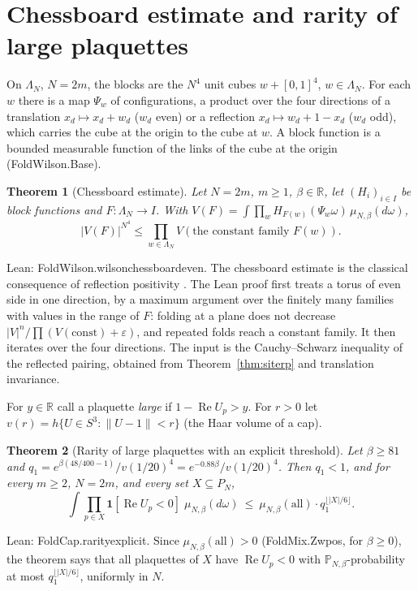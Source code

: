 \documentclass[11pt,a4paper]{article}
\newtheorem{theorem}{Theorem}[section]
\theoremstyle{definition}
\theoremstyle{remark}
\newcommand{\leanus}{\textunderscore\allowbreak{}}
\newcommand{\leandot}{.\allowbreak{}}
\newcommand{\lean}[1]{{\ttfamily\let\_\leanus #1}}
\newcommand{\R}{\mathbb{R}}
\renewcommand{\Re}{\operatorname{Re}}
\begin{document}
\section{Chessboard estimate and rarity of large plaquettes}\label{sec:peierls}

On $\Lambda_N$, $N=2m$, the blocks are the $N^4$ unit cubes $w+[0,1]^4$, $w\in\Lambda_N$. For each $w$ there is a map $\Psi_w$ of configurations, a product over the four directions of a translation $x_d\mapsto x_d+w_d$ ($w_d$ even) or a reflection $x_d\mapsto w_d+1-x_d$ ($w_d$ odd), which carries the cube at the origin to the cube at $w$. A block function is a bounded measurable function of the links of the cube at the origin (\lean{FoldWilson\leandot{}Base}).

\begin{theorem}[Chessboard estimate]\label{thm:chess}
Let $N=2m$, $m\ge1$, $\beta\in\R$, let $(H_i)_{i\in I}$ be block functions and $F:\Lambda_N\to I$. With $V(F)=\int\prod_{w}H_{F(w)}(\Psi_w\omega)\,\mu_{N,\beta}(d\omega)$,
\[
|V(F)|^{N^4}\le\prod_{w\in\Lambda_N}V(\text{the constant family }F(w)).
\]
\end{theorem}
Lean: \lean{FoldWilson\leandot{}wilson\_chessboard\_even}. The chessboard estimate is the classical consequence of reflection positivity \cite{FILS,Bis}. The Lean proof first treats a torus of even side in one direction, by a maximum argument over the finitely many families with values in the range of $F$: folding at a plane does not decrease $|V|^{n}/\prod(V(\text{const})+\varepsilon)$, and repeated folds reach a constant family. It then iterates over the four directions. The input is the Cauchy--Schwarz inequality of the reflected pairing, obtained from Theorem~\ref{thm:siterp} and translation invariance.

For $y\in\R$ call a plaquette \emph{large} if $1-\Re U_p>y$. For $r>0$ let $v(r)=h\{U\in S^3:\|U-1\|<r\}$ (the Haar volume of a cap).

\begin{theorem}[Rarity of large plaquettes with an explicit threshold]\label{thm:peierls}
Let $\beta\ge81$ and $q_1=e^{\beta(48/400-1)}/v(1/20)^4=e^{-0.88\beta}/v(1/20)^4$. Then $q_1<1$, and for every $m\ge2$, $N=2m$, and every set $X\subseteq P_N$,
\[
\int\prod_{p\in X}\mathbf 1[\Re U_p<0]\;\mu_{N,\beta}(d\omega)\ \le\ \mu_{N,\beta}(\text{all})\cdot q_1^{\lfloor|X|/6\rfloor}.
\]
\end{theorem}
Lean: \lean{FoldCap\leandot{}rarity\_explicit}. Since $\mu_{N,\beta}(\text{all})>0$ (\lean{FoldMix\leandot{}Zw\_pos}, for $\beta\ge0$), the theorem says that all plaquettes of $X$ have $\Re U_p<0$ with $\mathbb P_{N,\beta}$-probability at most $q_1^{\lfloor|X|/6\rfloor}$, uniformly in $N$.
\end{document}
